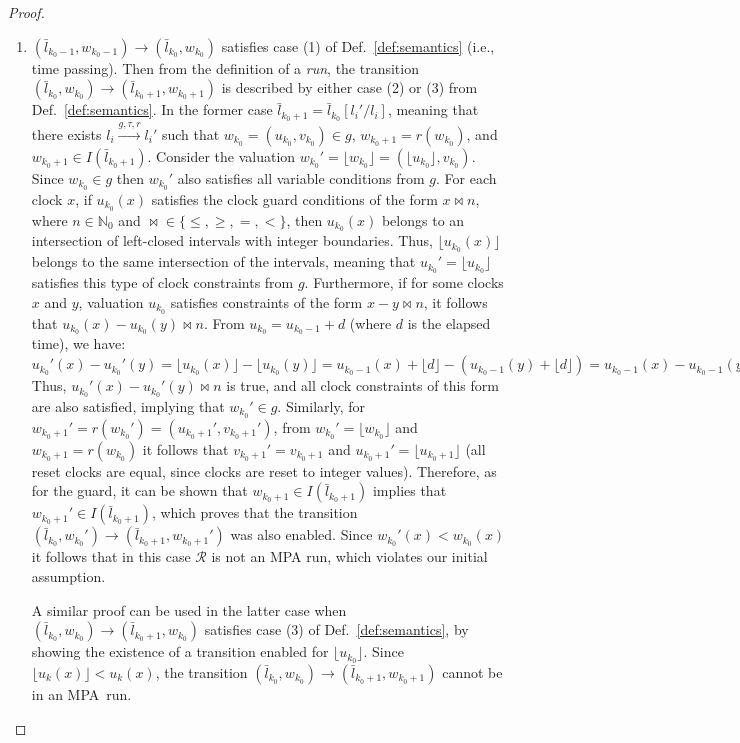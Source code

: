\begin{proof}
\begin{enumerate}
\item $(\bar{l}_{k_0-1},w_{k_0-1}) \rightarrow (\bar{l}_{k_0},w_{k_0})$ satisfies case (1) of Def.~\ref{def:semantics} (i.e., time passing). Then from the definition of a \textit{run}, the transition $(\bar{l}_{k_0},w_{k_0}) \rightarrow (\bar{l}_{k_0+1},w_{k_0+1})$ is described by either case (2) or (3) from Def.~\ref{def:semantics}. In the former case $\bar{l}_{k_0+1}=\bar{l}_{k_0}[l_i'/l_i]$, meaning that there exists $l_i \xrightarrow{g,\tau,r} l_i'$ such that $w_{k_0}=(u_{k_0},v_{k_0})\in g$, $w_{k_0+1}=r(w_{k_0})$, and $w_{k_0+1}\in I(\bar l_{k_0+1})$. 
Consider the valuation $w_{k_0}'=\lfloor w_{k_0}\rfloor=(\lfloor u_{k_0}\rfloor,v_{k_0})$. 
Since $w_{k_0}\in g$ then $w_{k_0}'$ also satisfies all variable conditions from $g$. For each clock $x$, if $u_{k_0}(x)$ satisfies the clock guard conditions of the form $x\bowtie n$, where $n\in \mathbb{N}_0$ and $\bowtie\in\{\leq,\geq,=,<\}$, then $u_{k_0}(x)$ belongs to an intersection of left-closed intervals with integer boundaries. Thus, $\lfloor u_{k_0}(x)\rfloor$ belongs to the same intersection of the intervals, meaning that $u_{k_0}'=\lfloor u_{k_0}\rfloor$ satisfies this type of clock constraints from $g$. 
Furthermore, if for some clocks $x$ and $y$, valuation $u_{k_0}$ satisfies constraints of the form $x-y\bowtie n$, it follows that $u_{k_0}(x)-u_{k_0}(y)\bowtie n$. From $u_{k_0}=u_{k_0-1}+d$ (where $d$ is the elapsed time), we have:
$
u_{k_0}'(x)-u_{k_0}'(y)=\lfloor u_{k_0}(x)\rfloor - \lfloor u_{k_0}(y)\rfloor = u_{k_0-1}(x)+\lfloor d\rfloor-(u_{k_0-1}(y)+\lfloor d\rfloor) =u_{k_0-1}(x)-u_{k_0-1}(y) =
 u_{k_0-1}(x)+d-u_{k_0-1}(y)-d=u_{k_0}(x)-u_{k_0}(y).
$
Thus, $u_{k_0}'(x)-u_{k_0}'(y)\bowtie n$ is true, and all clock constraints of this form are also satisfied, implying that $w_{k_0}'\in g$. Similarly, for $w_{k_0+1}'=r(w_{k_0}')=(u_{k_0+1}',v_{k_0+1}')$, from $w_{k_0}'=\lfloor w_{k_0}\rfloor$ and $w_{k_0+1}=r(w_{k_0})$ it follows that $v_{k_0+1}'=v_{k_0+1}$ and $u_{k_0+1}'=\lfloor u_{k_0+1} \rfloor$ (all reset clocks are equal, since clocks are reset to integer values). 
Therefore, as for the guard, it can be shown that $w_{k_0+1}\in I(\bar l_{k_0+1})$ implies that $w_{k_0+1}'\in I(\bar l_{k_0+1})$,  
which proves that the transition $(\bar{l}_{k_0},w_{k_0}') \rightarrow (\bar{l}_{k_0+1},w_{k_0+1}')$ was also enabled. Since $w_{k_0}'(x)<w_{k_0}(x)$ it follows that in this case $\mathcal{R}$ is not an MPA run, which violates our initial assumption.

A similar proof can be used in the latter case when $(\bar{l}_{k_0},w_{k_0})\rightarrow (\bar{l}_{k_0+1},w_{k_0})$ satisfies case (3) of Def.~\ref{def:semantics}, by showing the existence of a transition enabled for $\lfloor u_{k_0} \rfloor$. Since $\lfloor u_k(x) \rfloor < u_k(x)$,  the transition $(\bar{l}_{k_0},w_{k_0}) \rightarrow (\bar{l}_{k_0+1},w_{k_0+1})$ cannot be in an MPA~run.


\end{enumerate}
\end{proof}
